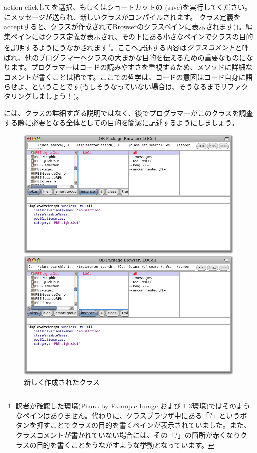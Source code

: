 \documentclass[a4paper,10pt,twoside]{book}
\begin{document}
action-clickしてを選択、もしくはショートカットの (save)を実行してください。にメッセージが送られ、新しいクラスがコンパイルされます。
クラス定義をacceptすると、クラスが作成されてBrowserのクラスペインに表示されます()。編集ペインにはクラス定義が表示され、その下にある小さなペインでクラスの目的を説明するようにうながされます\footnote{訳者が確認した環境(Pharo by Example Image および 1.3環境)ではそのようなペインはありません。代わりに、クラスブラウザ中にある「?」というボタンを押すことでクラスの目的を書くペインが表示されていました。また、クラスコメントが書かれていない場合には、その「?」の箇所が赤くなりクラスの目的を書くことをうながすような挙動となっています。}。ここへ記述する内容は\emph{クラスコメント}と呼ばれ、他のプログラマーへクラスの大まかな目的を伝えるための重要なものになります。\st プログラマーはコードの読みやすさを重視するため、メソッドに詳細なコメントが書くことは稀です。ここでの哲学は、コードの意図はコード自身に語らせよ、ということです(もしそうなっていない場合は、そうなるまでリファクタリングしましょう！)。


には、クラスの詳細すぎる説明ではなく、後でプログラマーがこのクラスを調査する際に必要となる全体としての目的を簡潔に記述するようにしましょう。


\begin{figure}[h!t]
\ifluluelse
	{\centerline {\includegraphics[width=\textwidth]{LOCell}}}
	{\centerline {\includegraphics[scale=0.7]{LOCell}}}
\caption{新しく作成されたクラス }
\end{figure}
\end{document}
